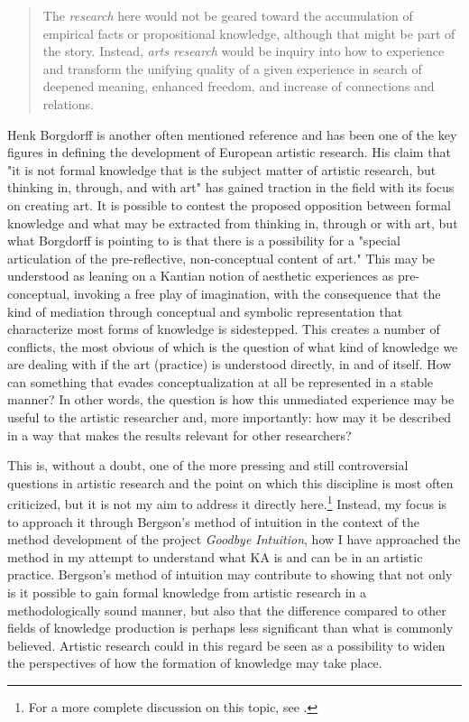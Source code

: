 \documentclass[11pt]{article}
\begin{document}
\begin{quote}
The \emph{research} here would not be geared toward the accumulation of empirical facts or propositional knowledge, although that might be part of the story. Instead, \emph{arts research} would be inquiry into how to experience and transform the unifying quality of a given experience in search of deepened meaning, enhanced freedom, and increase of connections and relations. \citep[p. 150]{johnson2010}
\end{quote}

Henk Borgdorff is another often mentioned reference and has been one of the key figures in defining the development of European artistic research. His claim that "it is not formal knowledge that is the subject matter of artistic research, but thinking in, through, and with art" \citep[p. 143]{borgdorff2012} has gained traction in the field with its focus on creating art. It is possible to contest the proposed opposition between formal knowledge and what may be extracted from thinking in, through or with art, but what Borgdorff is pointing to is that there is a possibility for a "special articulation of the pre-reflective, non-conceptual content of art." \citep[p. 143]{borgdorff2012} This may be understood as leaning on a Kantian notion of aesthetic experiences as pre-conceptual, invoking a free play of imagination, with the consequence that the kind of mediation through conceptual and symbolic representation that characterize most forms of knowledge is sidestepped. This creates a number of conflicts, the most obvious of which is the question of what kind of knowledge we are dealing with if the art (practice) is understood directly, in and of itself. How can something that evades conceptualization at all be represented in a stable manner? In other words, the question is how this unmediated experience may be useful to the artistic researcher and, more importantly: how may it be described in a way that makes the results relevant for other researchers?

This is, without a doubt, one of the more pressing and still controversial questions in artistic research and the point on which this discipline is most often criticized, but it is not my aim to address it directly here.\footnote{For a more complete discussion on this topic, see \citet{frisk-ost13}.} Instead, my focus is to approach it through  Bergson's method of intuition in the context of the method development of the project \emph{Goodbye Intuition}, how I have approached the method in my attempt to understand what KA is and can be in an artistic practice. Bergson's method of intuition may contribute to showing that not only is it possible to gain formal knowledge from artistic research in a methodologically sound manner, but also that the difference compared to other fields of knowledge production is perhaps less significant than what is commonly believed. Artistic research could in this regard be seen as a possibility to widen the perspectives of how the formation of knowledge may take place.
\end{document}
